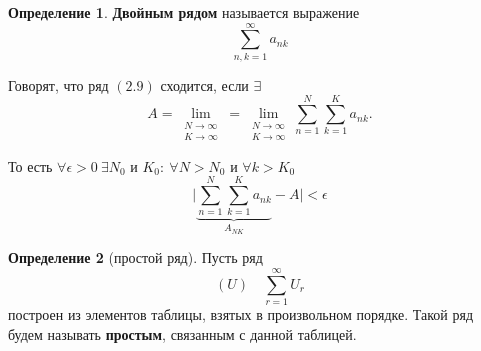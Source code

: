 \documentclass{report}
\theoremstyle{definition}
\newtheorem{definition}{Определение}[section]
\begin{document}
\begin{definition}
  \textbf{Двойным рядом} называется выражение
  \begin{equation}
    \sum_{n,k = 1}^{\infty} a_{nk}
  \end{equation}

  Говорят, что ряд $(2.9)$ сходится, если $\exists$
  \begin{equation*}
    A = \underset{\begin{array}{c}
        N\rightarrow\infty \\
        K\rightarrow\infty
      \end{array}}{\lim} = \underset{\begin{array}{c}
        N\rightarrow\infty \\
        K\rightarrow\infty
      \end{array}}{\lim}\sum_{n=1}^{N}\sum_{k=1}^{K}a_{nk}.
  \end{equation*}

  То есть $\forall \epsilon > 0 \ \exists N_0$ и $K_0: \ \forall N > N_0$ и $\forall k > K_0$
  \begin{equation*}
    \bigg|\underbrace{\sum_{n=1}^{N}\sum_{k=1}^{K}a_{nk}}_{A_{NK}} - A\bigg| < \epsilon
  \end{equation*}
\end{definition}

\begin{definition}[простой ряд]
  Пусть ряд
  \begin{equation}
    (U) \quad \sum_{r=1}^{\infty}U_r
  \end{equation}
  построен из элементов таблицы, взятых в произвольном порядке. Такой ряд будем называть \textbf{простым}, связанным с данной таблицей.
\end{definition}
\end{document}
